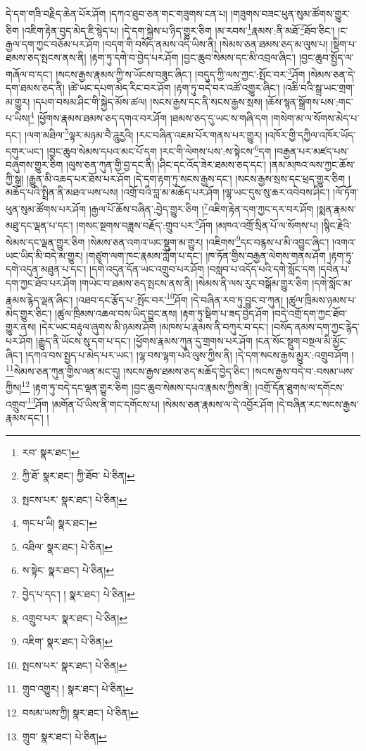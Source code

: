 དེ་དག་གཟི་བརྗིད་ཆེན་པོར་ཤོག །དཀའ་ཐུབ་ཅན་གང་གཟུགས་ངན་པ། །གཟུགས་བཟང་ཕུན་སུམ་ཚོགས་གྱུར་ཅིག །འཇིག་རྟེན་བུད་མེད་ཇི་སྙེད་པ། །དེ་དག་སྐྱེས་པ་ཉིད་གྱུར་ཅིག །མ་རབས་\footnote{རབ་  སྣར་ཐང་། }རྣམས་:ནི་མཐོ་\footnote{ཀྱི་ཐོ་  སྣར་ཐང་། ཀྱི་ཐོབ་  པེ་ཅིན། }ཐོབ་ཅིང་། །ང་རྒྱལ་དག་ཀྱང་བཅོམ་པར་ཤོག །བདག་གི་བསོད་ནམས་འདི་ཡིས་ནི། །སེམས་ཅན་ཐམས་ཅད་མ་ལུས་པ། །སྡིག་པ་ཐམས་ཅད་སྤངས་ནས་ནི། །རྟག་ཏུ་དགེ་བ་བྱེད་པར་ཤོག །བྱང་ཆུབ་སེམས་དང་མི་འབྲལ་ཞིང་། །བྱང་ཆུབ་སྤྱོད་ལ་གཞོལ་བ་དང་། །སངས་རྒྱས་རྣམས་ཀྱི་ས་ཡོངས་བཟུང་ཞིང་། །བདུད་ཀྱི་ལས་ཀྱང་:སྤོང་བར་\footnote{སྤངས་པར་  སྣར་ཐང་།  པེ་ཅིན། }ཤོག །སེམས་ཅན་དེ་དག་ཐམས་ཅད་ནི། །ཚེ་ཡང་དཔག་མེད་རིང་བར་ཤོག །རྟག་ཏུ་བདེ་བར་འཚོ་འགྱུར་ཞིང་། །འཆི་བའི་སྒྲ་ཡང་གྲག་མ་གྱུར། །དཔག་བསམ་ཤིང་གི་སྐྱེད་མོས་ཚལ། །སངས་རྒྱས་དང་ནི་སངས་རྒྱས་སྲས། །ཆོས་སྙན་སྒྲོགས་པས་:གང་པ་ཡིས།\footnote{གང་པ་ཡི།  སྣར་ཐང་། } །ཕྱོགས་རྣམས་ཐམས་ཅད་དགའ་བར་ཤོག །ཐམས་ཅད་དུ་ཡང་ས་གཞི་དག །གསེག་མ་ལ་སོགས་མེད་པ་དང་། །ལག་མཐིལ་\footnote{འཐིལ་  སྣར་ཐང་།  པེ་ཅིན། }ལྟར་མཉམ་བཻ་ཌཱུཪྱའི། །རང་བཞིན་འཇམ་པོར་གནས་པར་གྱུར། །འཁོར་གྱི་དཀྱིལ་འཁོར་ཡོད་དགུར་ཡང་། །བྱང་ཆུབ་སེམས་དཔའ་མང་པོ་དག །རང་གི་ལེགས་པས་:ས་སྟེངས་\footnote{ས་སྟེང་  སྣར་ཐང་།  པེ་ཅིན། }དག །བརྒྱན་པར་མཛད་པས་བཞུགས་གྱུར་ཅིག །ལུས་ཅན་ཀུན་གྱི་བྱ་དང་ནི། །ཤིང་དང་འོད་ཟེར་ཐམས་ཅད་དང་། །ནམ་མཁའ་ལས་ཀྱང་ཆོས་ཀྱི་སྒྲ། །རྒྱུན་མི་འཆད་པར་ཐོས་པར་ཤོག །དེ་དག་རྟག་ཏུ་སངས་རྒྱས་དང་། །སངས་རྒྱས་སྲས་དང་ཕྲད་གྱུར་ཅིག །མཆོད་པའི་སྤྲིན་ནི་མཐའ་ཡས་པས། །འགྲོ་བའི་བླ་མ་མཆོད་པར་ཤོག །ལྷ་ཡང་དུས་སུ་ཆར་འབེབས་ཤིང་། །ལོ་ཏོག་ཕུན་སུམ་ཚོགས་པར་ཤོག །རྒྱལ་པོ་ཆོས་བཞིན་:བྱེད་གྱུར་ཅིག །\footnote{བྱེད་པ་དང་། །  སྣར་ཐང་།  པེ་ཅིན། }འཇིག་རྟེན་དག་ཀྱང་དར་བར་ཤོག །སྨན་རྣམས་མཐུ་དང་ལྡན་པ་དང་། །གསང་སྔགས་བཟླས་བརྗོད་:གྲུབ་པར་\footnote{འགྲུབ་པར་  སྣར་ཐང་།  པེ་ཅིན། }ཤོག །མཁའ་འགྲོ་སྲིན་པོ་ལ་སོགས་པ། །སྙིང་རྗེའི་སེམས་དང་ལྡན་གྱུར་ཅིག །སེམས་ཅན་འགའ་ཡང་སྡུག་མ་གྱུར། །འཇིགས་\footnote{འཇིག་  སྣར་ཐང་།  པེ་ཅིན། }དང་བརྙས་པ་མི་འབྱུང་ཞིང་། །འགའ་ཡང་ཡིད་མི་བདེ་མ་གྱུར། །གཙུག་ལག་ཁང་རྣམས་ཀློག་པ་དང་། །ཁ་ཏོན་གྱིས་བརྒྱན་ལེགས་གནས་ཤོག །རྟག་ཏུ་དགེ་འདུན་མཐུན་པ་དང་། །དགེ་འདུན་དོན་ཡང་འགྲུབ་པར་ཤོག །བསླབ་པ་འདོད་པའི་དགེ་སློང་དག །དབེན་པ་དག་ཀྱང་ཐོབ་པར་ཤོག །གཡེང་བ་ཐམས་ཅད་སྤངས་ནས་ནི། །སེམས་ནི་ལས་རུང་བསྒོམ་གྱུར་ཅིག །དགེ་སློང་མ་རྣམས་རྙེད་ལྡན་ཞིང་། །འཐབ་དང་རྩོད་པ་:སྤོང་བར་\footnote{སྤངས་པར་  སྣར་ཐང་།  པེ་ཅིན། }ཤོག །དེ་བཞིན་རབ་ཏུ་བྱུང་བ་ཀུན། །ཚུལ་ཁྲིམས་ཉམས་པ་མེད་གྱུར་ཅིང་། །ཚུལ་ཁྲིམས་འཆལ་བས་ཡིད་བྱུང་ནས། །རྟག་ཏུ་སྡིག་པ་ཟད་བྱེད་ཤོག །བདེ་འགྲོ་དག་ཀྱང་ཐོབ་གྱུར་ནས། །དེར་ཡང་བརྟུལ་ཞུགས་མི་ཉམས་ཤོག །མཁས་པ་རྣམས་ནི་བཀུར་བ་དང་། །བསོད་ནམས་དག་ཀྱང་རྙེད་པར་ཤོག །རྒྱུད་ནི་ཡོངས་སུ་དག་པ་དང་། །ཕྱོགས་རྣམས་ཀུན་དུ་གྲགས་པར་ཤོག །ངན་སོང་སྡུག་བསྔལ་མི་མྱོང་ཞིང་། །དཀའ་བས་སྤྱད་པ་མེད་པར་ཡང་། །ལྷ་བས་ལྷག་པའི་ལུས་ཀྱིས་ནི། །དེ་དག་སངས་རྒྱས་མྱུར་:འགྲུབ་ཤོག །\footnote{གྲུབ་འགྱུར། །  སྣར་ཐང་།  པེ་ཅིན། }སེམས་ཅན་ཀུན་གྱིས་ལན་མང་དུ། །སངས་རྒྱས་ཐམས་ཅད་མཆོད་བྱེད་ཅིང་། །སངས་རྒྱས་བདེ་བ་:བསམ་ཡས་ཀྱིས།\footnote{བསམ་ཡས་ཀྱི།  སྣར་ཐང་།  པེ་ཅིན། } །རྟག་ཏུ་བདེ་དང་ལྡན་གྱུར་ཅིག །བྱང་ཆུབ་སེམས་དཔའ་རྣམས་ཀྱིས་ནི། །འགྲོ་དོན་ཐུགས་ལ་དགོངས་འགྲུབ་\footnote{གྲུབ་  སྣར་ཐང་།  པེ་ཅིན། }ཤོག །མགོན་པོ་ཡིས་ནི་གང་དགོངས་པ། །སེམས་ཅན་རྣམས་ལ་དེ་འབྱོར་ཤོག །དེ་བཞིན་རང་སངས་རྒྱས་རྣམས་དང་། །
